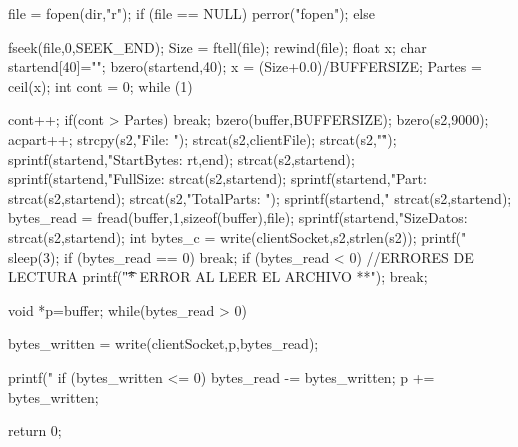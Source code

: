\begin{DoxyCode}
{        file = fopen(dir,"r");
        if (file == NULL) {
                perror("fopen");
                }
        else {
                fseek(file,0,SEEK_END);
                Size = ftell(file);
                rewind(file);
                float x;
                char startend[40]="";
                bzero(startend,40);
                x = (Size+0.0)/BUFFERSIZE;
                Partes = ceil(x);
                int cont = 0;
                while (1){
                        cont++;
                        if(cont > Partes){
                                break;
                        }
                        bzero(buffer,BUFFERSIZE);
                        bzero(s2,9000);
                        acpart++;
                        strcpy(s2,"File\n\rName: ");
                        strcat(s2,clientFile);
                        strcat(s2,"\n\r");
                        sprintf(startend,"StartBytes: %
      rt,end);
                        strcat(s2,startend);
                        sprintf(startend,"FullSize: %
                        strcat(s2,startend);
                        sprintf(startend,"Part: %
                        strcat(s2,startend);
                        strcat(s2,"TotalParts: ");
                        sprintf(startend,"%
                        strcat(s2,startend);
                        bytes_read = fread(buffer,1,sizeof(buffer),file);
                        sprintf(startend,"SizeDatos: %
                        strcat(s2,startend);
                        int bytes_c = write(clientSocket,s2,strlen(s2));
                        printf("\n%
                        sleep(3);
                        if (bytes_read == 0) {
                                break;
                        }
                        if (bytes_read < 0) {
                                //ERRORES DE LECTURA
                                printf("\t\n** ERROR AL LEER EL ARCHIVO **\n");
                                break;
                        }                       
                        
                        void *p=buffer;
                        while(bytes_read > 0) {
                                bytes_written = write(clientSocket,p,bytes_read);
      
                                printf("\n%
                                if (bytes_written <= 0) {
                                }
                                bytes_read -= bytes_written;
                                p += bytes_written;
                        }
                }
        
                }

        return 0;
        
}
\end{DoxyCode}
